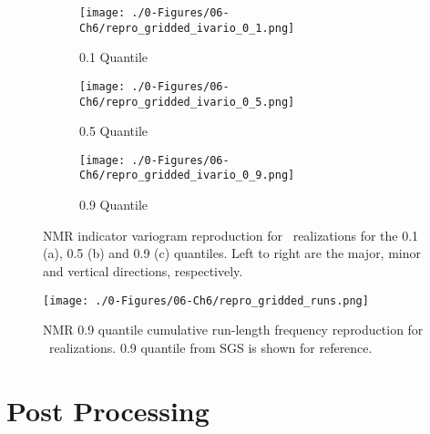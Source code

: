 \begin{figure}
    \begin{subfigure}{1.0\textwidth}
        \centering
        \texttt{[image: ./0-Figures/06-Ch6/repro\_gridded\_ivario\_0\_1.png]}
        \caption{0.1 Quantile}
    \end{subfigure}
    \begin{subfigure}{1.0\textwidth}
        \centering
        \texttt{[image: ./0-Figures/06-Ch6/repro\_gridded\_ivario\_0\_5.png]}
        \caption{0.5 Quantile}
    \end{subfigure}
    \begin{subfigure}{1.0\textwidth}
        \centering
        \texttt{[image: ./0-Figures/06-Ch6/repro\_gridded\_ivario\_0\_9.png]}
        \caption{0.9 Quantile}
    \end{subfigure}
    \caption{\gls{NMR} indicator variogram reproduction for \csnreals \ realizations for the 0.1 (a), 0.5 (b) and 0.9 (c) quantiles. Left to right are the major, minor and vertical directions, respectively.}
    \label{fig:repro_gridded_ivario}
\end{figure}

\begin{figure}[htb!]
    \centering
    \texttt{[image: ./0-Figures/06-Ch6/repro\_gridded\_runs.png]}
    \caption{\gls{NMR} 0.9 quantile cumulative run-length frequency reproduction for \csnreals \ realizations. 0.9 quantile from \gls{SGS} is shown for reference.}
    \label{fig:repro_gridded_runs}
\end{figure}


\FloatBarrier
\section{Post Processing}
\label{sec:post}

